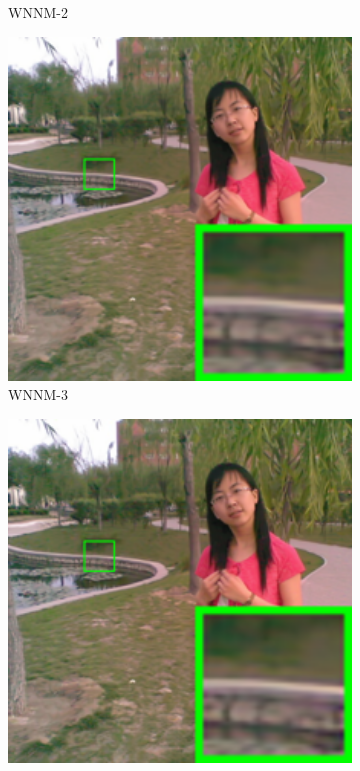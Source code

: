 \begin{figure}
\begin{subfigure}[t]{0.19\textwidth}
		\caption{WNNM-2}
    \end{subfigure}
    \hfill
    \begin{subfigure}[t]{0.19\textwidth}
        \centering
        \includegraphics[width=1\textwidth]{images/mcwnnm/nc/resize_br_WNNM_ADMM_chinesegirl.png}
		\caption{WNNM-3}
    \end{subfigure}
    \hfill
    \begin{subfigure}[t]{0.19\textwidth}
        \centering
        \includegraphics[width=1\textwidth]{images/mcwnnm/nc/resize_br_CWNNM_ADMM_NL_chinesegirl.png}

\end{subfigure}
\end{figure}
